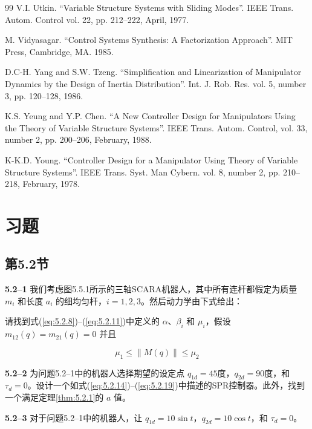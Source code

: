 \documentclass[UTF8,12pt,a4paper]{ctexart}
\begin{document}
\begin{thebibliography}{99}
V.I. Utkin.
``Variable Structure Systems with Sliding Modes''. IEEE Trans. Autom. Control vol. 22, pp. 212--222, April, 1977.

M. Vidyasagar.
``Control Systems Synthesis: A Factorization Approach''. MIT Press, Cambridge, MA. 1985.

D.C-H. Yang and S.W. Tzeng.
``Simplification and Linearization of Manipulator Dynamics by the Design of Inertia Distribution''. Int. J. Rob. Res. vol. 5, number 3, pp. 120--128, 1986.

K.S. Yeung and Y.P. Chen.
``A New Controller Design for Manipulators Using the Theory of Variable Structure Systems''. IEEE Trans. Autom. Control, vol. 33, number 2, pp. 200--206, February, 1988.

K-K.D. Young.
``Controller Design for a Manipulator Using Theory of Variable Structure Systems''. IEEE Trans. Syst. Man Cybern. vol. 8, number 2, pp. 210--218, February, 1978.

\end{thebibliography}

\section*{习题}

\subsection*{第5.2节}

\textbf{5.2--1} 我们考虑图5.5.1所示的三轴SCARA机器人，其中所有连杆都假定为质量 $m_i$ 和长度 $a_i$ 的细均匀杆，$i = 1, 2, 3$。然后动力学由下式给出：

请找到式(\ref{eq:5.2.8})--(\ref{eq:5.2.11})中定义的 $\alpha$、$\beta_i$ 和 $\mu_i$，假设 $m_{12}(q) = m_{21}(q) = 0$ 并且

\begin{equation}
\mu_1 \leq \|M(q)\| \leq \mu_2
\end{equation}

\textbf{5.2--2} 为问题5.2--1中的机器人选择期望的设定点 $q_{1d} = 45$度，$q_{2d} = 90$度，和 $\tau_d = 0$。设计一个如式(\ref{eq:5.2.14})--(\ref{eq:5.2.19})中描述的SPR控制器。此外，找到一个满足定理\ref{thm:5.2.1}的 $a$ 值。

\textbf{5.2--3} 对于问题5.2--1中的机器人，让 $q_{1d} = 10\sin t$，$q_{2d} = 10\cos t$，和 $\tau_d = 0$。
\end{document}

